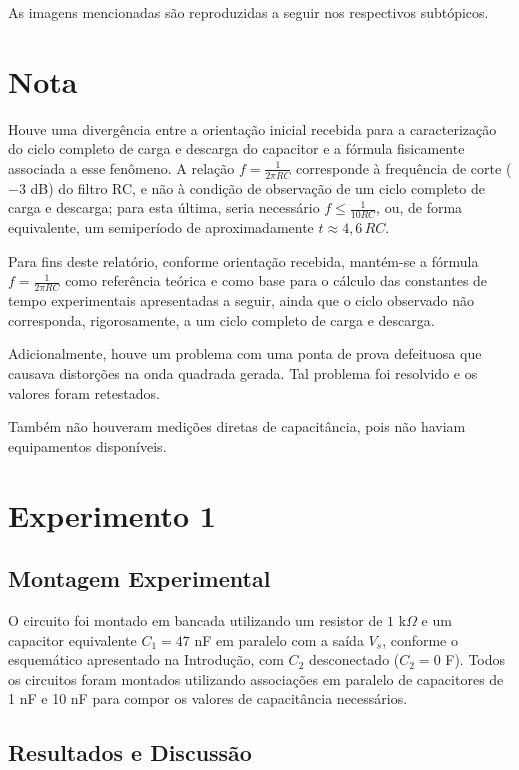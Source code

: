 \documentclass[a4paper,oneside,10pt]{article}
\begin{document}
As imagens mencionadas são reproduzidas a seguir nos respectivos subtópicos.

\section{Nota}

Houve uma divergência entre a orientação inicial recebida para a caracterização do ciclo completo de carga e descarga do capacitor e a fórmula fisicamente associada a esse fenômeno. A relação $f = \frac{1}{2\pi RC}$ corresponde à frequência de corte ($-3$ dB) do filtro RC, e não à condição de observação de um ciclo completo de carga e descarga; para esta última, seria necessário $f \le \frac{1}{10RC}$, ou, de forma equivalente, um semiperíodo de aproximadamente $t \approx 4,6\,RC$.

Para fins deste relatório, conforme orientação recebida, mantém-se a fórmula $f = \frac{1}{2\pi RC}$ como referência teórica e como base para o cálculo das constantes de tempo experimentais apresentadas a seguir, ainda que o ciclo observado não corresponda, rigorosamente, a um ciclo completo de carga e descarga.

Adicionalmente, houve um problema com uma ponta de prova defeituosa que causava distorções na onda quadrada gerada. Tal problema foi resolvido e os valores foram retestados.

Também não houveram medições diretas de capacitância, pois não haviam equipamentos disponíveis.


\section{Experimento 1}

\subsection{Montagem Experimental}

O circuito foi montado em bancada utilizando um resistor de $1$ k$\Omega$ e um capacitor equivalente $C_1 = 47$ nF em paralelo com a saída $V_s$, conforme o esquemático apresentado na Introdução, com $C_2$ desconectado ($C_2 = 0$ F). Todos os circuitos foram montados utilizando associações em paralelo de capacitores de 1 nF e 10 nF para compor os valores de capacitância necessários.

\subsection{Resultados e Discussão}
\end{document}
